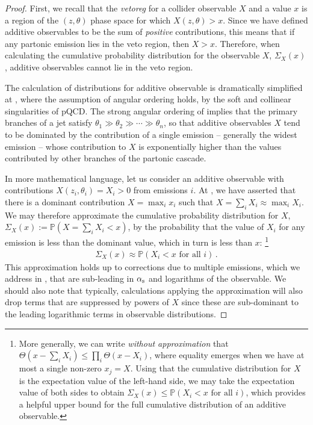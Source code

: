 \begin{proof}

First, we recall that the \emph{\gls{vetoreg}} for a collider observable \(X\) and a value \(x\) is a region of the \((z, \theta)\) phase space for which \(X(z,\theta) > x\).
%
Since we have defined additive observables to be the sum of \textit{positive} contributions, this means that if any partonic emission lies in the veto region, then \(X > x\).
%
Therefore, when calculating the cumulative probability distribution for the observable \(X\), \(\Sigma_X(x)\), additive observables cannot lie in the veto region.

The calculation of distributions for additive observable is dramatically simplified at , where the assumption of angular ordering holds, by the soft and collinear singularities of pQCD.
%
The strong angular ordering of  implies that the primary branches of a jet satisfy \(\theta_1 \gg \theta_2 \gg \cdots \gg \theta_n\), so that additive observables \(X\) tend to be dominated by the contribution of a single emission -- generally the widest emission -- whose contribution to \(X\) is exponentially higher than the values contributed by other branches of the partonic cascade.

In more mathematical language, let us consider an additive observable with contributions \(X(z_i, \theta_i) = X_i > 0\) from emissions \(i\).
%
At , we have asserted that there is a dominant contribution \(X = \max_i x_i\) such that \(X = \sum_i X_i \approx \max_i X_i\).
%
We may therefore approximate the cumulative probability distribution for \(X\), \(\Sigma_X(x) := \mathbb{P}(X = \sum_i X_i < x)\), by the probability that the value of \(X_i\) for any emission is less than the dominant value, which in turn is less than \(x\):%
\footnote{
    More generally, we can write \textit{without approximation} that \(\Theta(x - \sum_i X_i) \leq \prod_i \Theta(x - X_i)\), where equality emerges when we have at most a single non-zero \(x_j = X\).
    Using that the cumulative distribution for \(X\) is the expectation value of the left-hand side, we may take the expectation value of both sides to obtain \(\Sigma_X(x) \leq \mathbb{P}(X_i < x \text{ for all } i)\), which provides a helpful upper bound for the full cumulative distribution of an additive observable.
}
\begin{align}
    \Sigma_X(x) \approx \mathbb{P}(X_i < x \text{ for all } i)
    \,.
\end{align}
%
This approximation holds up to corrections due to multiple emissions, which we address in , that are sub-leading in \(\alpha_{\mathrm{s}}\) and logarithms of the observable.
%
We should also note that typically, calculations applying the  approximation will also drop terms that are suppressed by powers of \(X\) since these are sub-dominant to the leading logarithmic terms in observable distributions.
\end{proof}



